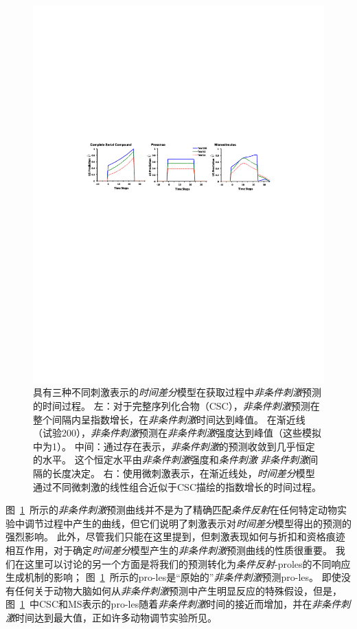 {\begin{figure}[!htb]
	\centering
	\includegraphics[width=0.8\linewidth]{chap11/fig_11_6}
	\caption{具有三种不同刺激表示的\textit{时间差分}模型在获取过程中\textit{非条件刺激}预测的时间过程。
		左：对于完整序列化合物（CSC），\textit{非条件刺激}预测在整个间隔内呈指数增长，在\textit{非条件刺激}时间达到峰值。
		在渐近线（试验200），\textit{非条件刺激}预测在\textit{非条件刺激}强度达到峰值（这些模拟中为1）。
		中间：通过存在表示，\textit{非条件刺激}的预测收敛到几乎恒定的水平。
		这个恒定水平由\textit{非条件刺激}强度和\textit{条件刺激} \textit{非条件刺激}间隔的长度决定。
		右：使用微刺激表示，在渐近线处，\textit{时间差分}模型通过不同微刺激的线性组合近似于CSC描绘的指数增长的时间过程。\label{fig:11_6}}
\end{figure}
			
			
图~\ref{fig:11_6}~所示的\textit{非条件刺激}预测曲线并不是为了精确匹配\textit{条件反射}在任何特定动物实验中调节过程中产生的曲线，但它们说明了刺激表示对\textit{时间差分}模型得出的预测的强烈影响。
此外，尽管我们只能在这里提到，但刺激表现如何与折扣和资格痕迹相互作用，对于确定\textit{时间差分}模型产生的\textit{非条件刺激}预测曲线的性质很重要。
我们在这里可以讨论的另一个方面是将我们的预测转化为\textit{条件反射}-proles的不同响应生成机制的影响；
图~\ref{fig:11_6}~所示的pro-les是“原始的”\textit{非条件刺激}预测pro-les。
即使没有任何关于动物大脑如何从\textit{非条件刺激}预测中产生明显反应的特殊假设，但是，图~\ref{fig:11_6}~中CSC和MS表示的pro-les随着\textit{非条件刺激}时间的接近而增加，并在\textit{非条件刺激}时间达到最大值，正如许多动物调节实验所见。


}
